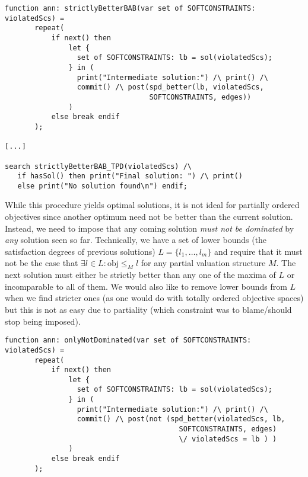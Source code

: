 \begin{lstlisting}
function ann: strictlyBetterBAB(var set of SOFTCONSTRAINTS: violatedScs) =
       repeat(
           if next() then
               let {
                 set of SOFTCONSTRAINTS: lb = sol(violatedScs); 
               } in (
                 print("Intermediate solution:") /\ print() /\
                 commit() /\ post(spd_better(lb, violatedScs, 
                                  SOFTCONSTRAINTS, edges))
               )
           else break endif
       );
       
[...]
       
search strictlyBetterBAB_TPD(violatedScs) /\ 
   if hasSol() then print("Final solution: ") /\ print() 
   else print("No solution found\n") endif;
\end{lstlisting}

While this procedure yields optimal solutions, it is not ideal for partially ordered objectives since 
another optimum need not be better than the current solution. Instead, we need to impose that any coming 
solution \emph{must not be dominated} by \emph{any} solution seen so far. Technically,
we have a set of lower bounds (the satisfaction degrees of previous solutions) $L = \{l_1, \ldots, l_m \}$ and
require that it must not be the case that $\exists l \in L : \mathrm{obj} \leq_M l$ for any partial valuation
structure $M$. The next solution must either be strictly better than any one of the maxima of $L$ or incomparable to
all of them. We would also like to remove lower bounds from $L$ when we find stricter ones (as one would do with
totally ordered objective spaces) but this is not as easy due to partiality (which constraint was to blame/should
stop being imposed).

\begin{lstlisting}
function ann: onlyNotDominated(var set of SOFTCONSTRAINTS: violatedScs) =
       repeat(
           if next() then
               let {
                 set of SOFTCONSTRAINTS: lb = sol(violatedScs); 
               } in (
                 print("Intermediate solution:") /\ print() /\
                 commit() /\ post(not (spd_better(violatedScs, lb, 
                                         SOFTCONSTRAINTS, edges) 
                                         \/ violatedScs = lb ) )
               )
           else break endif
       );
\end{lstlisting}

